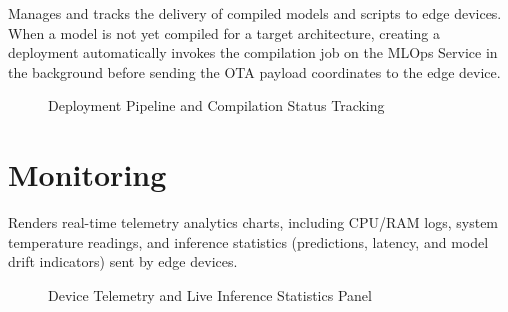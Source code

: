 Manages and tracks the delivery of compiled models and scripts to edge devices. When a model is not yet compiled for a target architecture, creating a deployment automatically invokes the compilation job on the \gls{MLOps} Service in the background before sending the \gls{OTA} payload coordinates to the edge device.

\begin{figure}[H]
    \centering
    \caption{Deployment Pipeline and Compilation Status Tracking}
    \label{fig:screenshot_deployments}
\end{figure}

\section{Monitoring}

Renders real-time telemetry analytics charts, including \gls{CPU}/\gls{RAM} logs, system temperature readings, and inference statistics (predictions, latency, and model drift indicators) sent by edge devices.

\begin{figure}[H]
    \centering
    \caption{Device Telemetry and Live Inference Statistics Panel}
    \label{fig:screenshot_monitoring}
\end{figure}
